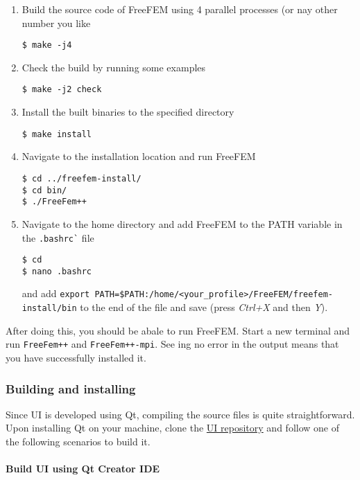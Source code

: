 \begin{enumerate}
\item Build the source code of FreeFEM using 4 parallel processes (or nay other number you like
\begin{verbatim}
$ make -j4
\end{verbatim}

\item Check the build by running some examples
\begin{verbatim}
$ make -j2 check
\end{verbatim}

\item Install the built binaries to the specified directory
\begin{verbatim}
$ make install
\end{verbatim}

\item Navigate to the installation location and run FreeFEM
\begin{verbatim}
$ cd ../freefem-install/
$ cd bin/
$ ./FreeFem++
\end{verbatim}

\item Navigate to the home directory and add FreeFEM to the PATH variable in the \verb|.bashrc`| file
\begin{verbatim}
$ cd
$ nano .bashrc
\end{verbatim}
and add \verb|export PATH=$PATH:/home/<your_profile>/FreeFEM/freefem-install/bin| to the end of the file and save (press \textit{Ctrl+X} and then \textit{Y}).

\end{enumerate}

After doing this, you should be abale to run FreeFEM. Start a new terminal and run \verb|FreeFem++| and \verb|FreeFem++-mpi|. See ing no error in the output means that you have successfully installed it.

\subsubsection{Building and installing \biodeg{}} \label{sec:build_biodeg}

Since \biodeg{} UI is developed using Qt, compiling the source files is quite straightforward. Upon installing Qt on your machine, clone the \href{https://github.com/mbarzegary/BioDeg-UI}{\biodeg{} UI repository} and follow one of the following scenarios to build it. 

\paragraph{Build \biodeg{} UI using Qt Creator IDE}

